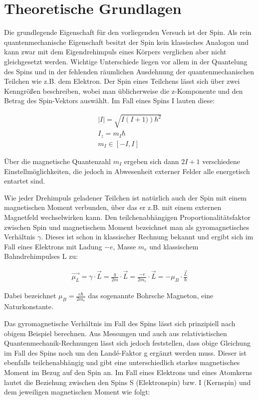 \section{Theoretische Grundlagen}
Die grundlegende Eigenschaft für den vorliegenden Versuch ist der Spin. Als rein quantenmechanische Eigenschaft besitzt der Spin kein klassisches Analogon und kann zwar mit dem Eigendrehimpuls eines Körpers verglichen aber nicht gleichgesetzt werden. Wichtige Unterschiede liegen vor allem in der Quantelung des Spins und in der fehlenden räumlichen Ausdehnung der quantenmechanischen Teilchen wie z.B. dem Elektron. Der Spin eines Teilchens lässt sich über zwei Kenngrößen beschreiben, wobei man üblicherweise die z-Komponente und den Betrag des Spin-Vektors auswählt. Im Fall eines Spins I lauten diese:

\begin{align}
\vert I \vert = \sqrt{I\left(I+1)\right)\hbar^2} \\
I_z=m_I \hbar \\
m_I \in [-I,I]
\end{align}

Über die magnetische Quantenzahl $m_I$ ergeben sich dann $2I+1$ verschiedene Einstellmöglichkeiten, die jedoch in Abwesenheit externer Felder alle energetisch entartet sind.

Wie jeder Drehimpuls geladener Teilchen ist natürlich auch der Spin mit einem magnetischen Moment verbunden, über das er z.B. mit einem externen Magnetfeld wechselwirken kann. Den teilchenabhängigen Proportionalitätsfaktor zwischen Spin und magnetischem Moment bezeichnet man als gyromagnetisches Verhältnis $\gamma$. Dieses ist schon in klassischer Rechnung bekannt und ergibt sich im Fall eines Elektrons mit Ladung $-e$, Masse $m_e$ und klassischem Bahndrehimpulses L zu:

\begin{align}
\overrightarrow{\mu_L}=\gamma \cdot \overrightarrow{L} = \frac{q}{2m}\cdot \overrightarrow{L}=\frac{-e}{2m_e}\cdot \overrightarrow{L} = -\mu_B \cdot \frac{\overrightarrow{L}}{\hbar}
\end{align}

Dabei bezeichnet $\mu_B=\frac{e\hbar}{2m_e}$ das sogenannte Bohrsche Magneton, eine Naturkonstante. 

Das gyromagnetische Verhältnis im Fall des Spins lässt sich prinzipiell nach obigem Beispiel berechnen. Aus Messungen und auch aus relativistischen Quantenmechanik-Rechnungen lässt sich jedoch feststellen, dass obige Gleichung im Fall des Spins noch um den Landé-Faktor g ergänzt werden muss. Dieser ist ebenfalls teilchenabhängig und gibt eine unterschiedlich starkes magnetisches Moment im Bezug auf den Spin an. Im Fall eines Elektrons und eines Atomkerns lautet die Beziehung zwischen den Spins S (Elektronspin) bzw. I (Kernspin) und dem jeweiligen magnetischen Moment wie folgt:

